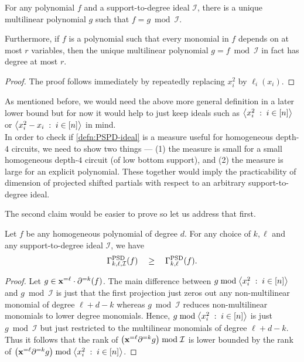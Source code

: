 \begin{observation}\label{obs:support-redn}
For any polynomial $f$ and a support-to-degree ideal $\mathcal{I}$, there is a unique multilinear polynomial $g$ such that $f = g \bmod\mathcal{I}$. 

Furthermore, if $f$ is a polynomial such that every monomial in $f$ depends on at most $r$ variables, then the unique multilinear polynomial $g = f \bmod\mathcal{I}$ in fact has degree at most $r$. 
\end{observation}
\begin{proof}
The proof follows immediately by repeatedly replacing $x_i^2$ by $\ell_i(x_i)$.
\end{proof}

As mentioned before, we would need the above more general definition in a later lower bound but for now it would help to just keep ideals such as $\left\langle x_i^2\;:\;i\in [n]\right\rangle$ or $\left\langle x_i^2 - x_i\;:\;i\in [n]\right\rangle$ in mind. \\

In order to check if \autoref{defn:PSPD-ideal} is a measure useful for homogeneous depth-$4$ circuits, we need to show two things --- (1) the measure is small for a small homogeneous depth-$4$ circuit (of low bottom support), and (2) the measure is large for an explicit polynomial.
These together would imply the practicability of dimension of projected shifted partials with respect to an arbitrary support-to-degree ideal.

The second claim would be easier to prove so let us address that first. 

\begin{lemma}\label{lem:PSD-I-lowerbound} Let $f$ be any homogeneous polynomial of degree $d$. For any choice of $k,\ell$ and any support-to-degree ideal $\mathcal{I}$, we have
\[
\Gamma^{\mathrm{PSD}}_{k,\ell,\mathcal{I}}(f) \quad \geq \quad \Gamma^{\mathrm{PSD}}_{k,\ell}(f).
\]
\end{lemma}
\begin{proof}
  Let $g \in \mathbf{x}^{=\ell} \cdot \partial^{=k}(f)$.
The main difference between $g \bmod \left\langle x_i^2\;:\; i \in [n]\right\rangle$ and $g \bmod\mathcal{I}$ is just that the first projection just zeros out any non-multilinear monomial of degree $\ell + d -k$ whereas $g \bmod\mathcal{I}$ reduces non-multilinear monomials to lower degree monomials.
Hence, $g \bmod\left\langle x_i^2\;:\; i \in [n]\right\rangle$ is just $g \bmod \mathcal{I}$ but just restricted to the multilinear monomials of degree $\ell + d - k$. 
Thus it follows that the rank of $\left(\mathbf{x}^{=\ell} \partial^{=k}g\right) \bmod\mathcal{I}$ is lower bounded by the rank of $\left(\mathbf{x}^{=\ell} \partial^{=k}g\right) \bmod\left\langle x_i^2\;:\; i \in [n]\right\rangle$.
\end{proof}

